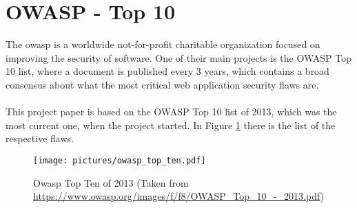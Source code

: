 \section{OWASP - Top 10}

The \gls*{owasp} is a worldwide not-for-profit charitable organization focused on improving the security of software. One of their main projects is the OWASP Top 10 list, where a document is published every 3 years, which contains a broad consensus about what the most critical web application security flaws are. \\
\\
This project paper is based on the OWASP Top 10 list of 2013, which was the most current one, when the project started. In Figure \ref{fig:owasp_top_ten} there is the list of the respective flaws.

\begin{figure}[htbp]
  \begin{center}
    \texttt{[image: pictures/owasp\_top\_ten.pdf]}
    \caption{Owasp Top Ten of 2013 (Taken from \href{https://www.owasp.org/images/f/f8/OWASP_Top_10_-_2013.pdf}{https://www.owasp.org/images/f/f8/OWASP\_Top\_10\_-\_2013.pdf})}
    \label{fig:owasp_top_ten}
  \end{center}
\end{figure}
